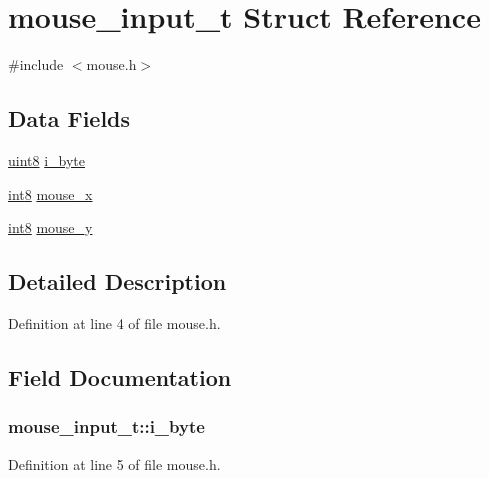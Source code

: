 \hypertarget{structmouse__input__t}{
\section{mouse\_\-input\_\-t Struct Reference}
\label{structmouse__input__t}
}


{\ttfamily \#include $<$mouse.h$>$}

\subsection*{Data Fields}
\begin{DoxyCompactItemize}
\item 
\hyperlink{int__types_8h_adde6aaee8457bee49c2a92621fe22b79}{uint8} \hyperlink{structmouse__input__t_a99209b3ab822c59d0795213d31c4b951}{i\_\-byte}
\item 
\hyperlink{int__types_8h_ae47c588f3ab8c61121c1c7ab7edc47cd}{int8} \hyperlink{structmouse__input__t_a9eef7720663489827c9a6bdeef2e85fd}{mouse\_\-x}
\item 
\hyperlink{int__types_8h_ae47c588f3ab8c61121c1c7ab7edc47cd}{int8} \hyperlink{structmouse__input__t_ad442be4c0b784a68a039ee0b84f53b24}{mouse\_\-y}
\end{DoxyCompactItemize}


\subsection{Detailed Description}


Definition at line 4 of file mouse.h.



\subsection{Field Documentation}
\hypertarget{structmouse__input__t_a99209b3ab822c59d0795213d31c4b951}{
\subsubsection[{i\_\-byte}]{ {\bf mouse\_\-input\_\-t::i\_\-byte}}}
\label{structmouse__input__t_a99209b3ab822c59d0795213d31c4b951}


Definition at line 5 of file mouse.h.

